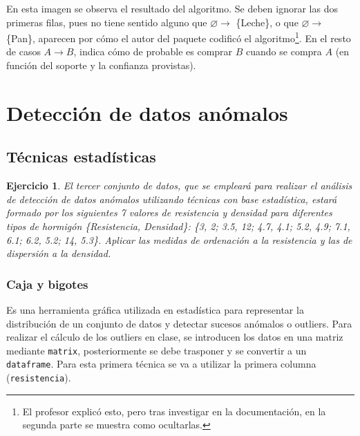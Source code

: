 \documentclass[12pt]{report}\usepackage[]{graphicx}\usepackage[dvipsnames]{xcolor}
\newtheorem{exercise}{Ejercicio}[section]
\begin{document}
			En esta imagen se observa el resultado del algoritmo. Se deben ignorar las dos primeras filas, pues no tiene sentido alguno que $\varnothing \rightarrow$ \{Leche\}, o que $\varnothing \rightarrow$ \{Pan\}, aparecen por cómo el autor del paquete codificó el algoritmo\footnote{El profesor explicó esto, pero tras investigar en la documentación, en la segunda parte se muestra como ocultarlas. }. En el resto de casos $A \rightarrow B$, indica cómo de probable es comprar $B$ cuando se compra $A$ (en función del soporte y la confianza provistas). 
			
			
		\section{Detección de datos anómalos}
			
			\subsection{Técnicas estadísticas}
			
				\begin{exercise}
					El tercer conjunto de datos, que se empleará para realizar el análisis de detección de datos anómalos utilizando técnicas con base estadística, estará formado por los siguientes 7 valores de resistencia y densidad para diferentes tipos de hormigón \{Resistencia, Densidad\}: \{3, 2; 3.5, 12; 4.7, 4.1; 5.2, 4.9; 7.1, 6.1; 6.2, 5.2; 14, 5.3\}. Aplicar las medidas de ordenación a la resistencia y las de dispersión a la densidad.
				\end{exercise}
				
				\subsubsection{Caja y bigotes}\label{subsub:caja_bigotes}
				
					Es una herramienta gráfica utilizada en estadística para representar la distribución de un conjunto de datos y detectar sucesos anómalos o outliers. Para realizar el cálculo de los outliers en clase, se introducen los datos en una matriz mediante \texttt{matrix}, posteriormente se debe trasponer y se convertir a un \texttt{dataframe}. Para esta primera técnica se va a utilizar la primera columna (\texttt{resistencia}).
					
\end{document}
